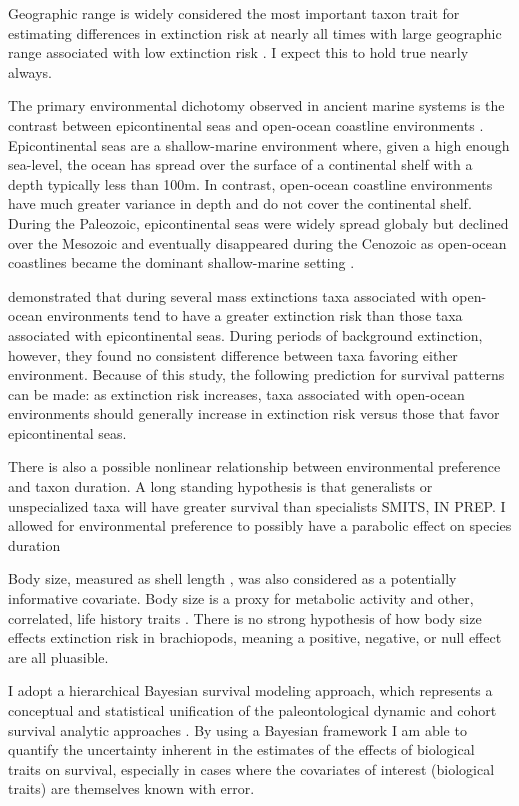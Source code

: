 \documentclass[12pt,letterpaper]{article}
\begin{document}
Geographic range is widely considered the most important taxon trait for estimating differences in extinction risk at nearly all times with large geographic range associated with low extinction risk \citep{Jablonski1986,Jablonski1987,Jablonski2003,Payne2007}. I expect this to hold true nearly always.

The primary environmental dichotomy observed in ancient marine systems is the contrast between epicontinental seas and open-ocean coastline environments \citep{Miller2009a,Peters2008,Sheehan2001b}. Epicontinental seas are a shallow-marine environment where, given a high enough sea-level, the ocean has spread over the surface of a continental shelf with a depth typically less than 100m. In contrast, open-ocean coastline environments have much greater variance in depth and do not cover the continental shelf. During the Paleozoic, epicontinental seas were widely spread globaly but declined over the Mesozoic and eventually disappeared during the Cenozoic as open-ocean coastlines became the dominant shallow-marine setting \citep{Peters2008,Miller2009a,Johnson1974}.

\citet{Miller2009a} demonstrated that during several mass extinctions taxa associated with open-ocean environments tend to have a greater extinction risk than those taxa associated with epicontinental seas. During periods of background extinction, however, they found no consistent difference between taxa favoring either environment. Because of this study, the following prediction for survival patterns can be made: as extinction risk increases, taxa associated with open-ocean environments should generally increase in extinction risk versus those that favor epicontinental seas.

There is also a possible nonlinear relationship between environmental preference and taxon duration. A long standing hypothesis is that generalists or unspecialized taxa will have greater survival than specialists \citep{Simpson1944,Liow2004a,Liow2007b,Nurnberg2013a,Nurnberg2015,Baumiller1993} \uppercase{Smits, in prep}. I allowed for environmental preference to possibly have a parabolic effect on species duration 

Body size, measured as shell length \citep{Payne2014}, was also considered as a potentially informative covariate. Body size is a proxy for metabolic activity and other, correlated, life history traits \citep{Payne2014}. There is no strong hypothesis of how body size effects extinction risk in brachiopods, meaning a positive, negative, or null effect are all pluasible.

I adopt a hierarchical Bayesian survival modeling approach, which represents a conceptual and statistical unification of the paleontological dynamic and cohort survival analytic approaches \citep{VanValen1973,VanValen1979,Raup1978,Raup1975,Foote1988,Baumiller1993,Simpson2006}. By using a Bayesian framework I am able to quantify the uncertainty inherent in the estimates of the effects of biological traits on survival, especially in cases where the covariates of interest (biological traits) are themselves known with error. 
\end{document}
